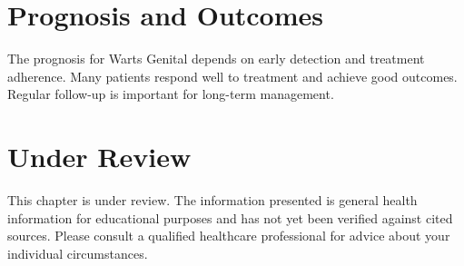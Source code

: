 \section*{Prognosis and Outcomes}
The prognosis for Warts Genital depends on early detection and treatment adherence. Many patients respond well to treatment and achieve good outcomes. Regular follow-up is important for long-term management.
\section*{Under Review}
This chapter is under review. The information presented is general health information for educational purposes and has not yet been verified against cited sources. Please consult a qualified healthcare professional for advice about your individual circumstances.


\clearpage

